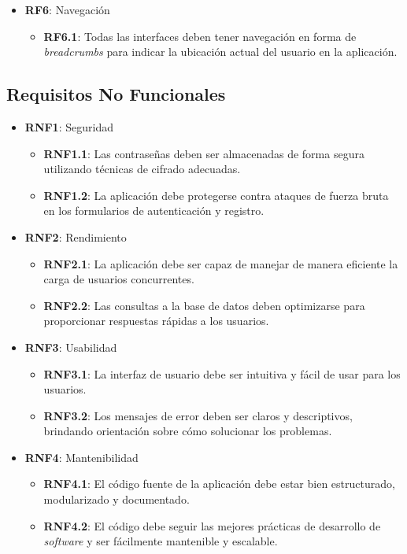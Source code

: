\begin{itemize}
  \item \textbf{RF6}: Navegación
  \begin{itemize}
    \item \textbf{RF6.1}: Todas las interfaces deben tener navegación en forma de \textit{breadcrumbs} para indicar la ubicación actual del usuario en la aplicación.
  \end{itemize}
  
\end{itemize}

\subsection{Requisitos No Funcionales}

\begin{itemize}

  \item \textbf{RNF1}: Seguridad
  \begin{itemize}
    \item \textbf{RNF1.1}: Las contraseñas deben ser almacenadas de forma segura utilizando técnicas de cifrado adecuadas.
    \item \textbf{RNF1.2}: La aplicación debe protegerse contra ataques de fuerza bruta en los formularios de autenticación y registro.
  \end{itemize}
  
  \item \textbf{RNF2}: Rendimiento
  \begin{itemize}
    \item \textbf{RNF2.1}: La aplicación debe ser capaz de manejar de manera eficiente la carga de usuarios concurrentes.
    \item \textbf{RNF2.2}: Las consultas a la base de datos deben optimizarse para proporcionar respuestas rápidas a los usuarios.
  \end{itemize}
  
  \item \textbf{RNF3}: Usabilidad
  \begin{itemize}
    \item \textbf{RNF3.1}: La interfaz de usuario debe ser intuitiva y fácil de usar para los usuarios.
    \item \textbf{RNF3.2}: Los mensajes de error deben ser claros y descriptivos, brindando orientación sobre cómo solucionar los problemas.
  \end{itemize}
  
  \item \textbf{RNF4}: Mantenibilidad
  \begin{itemize}
    \item \textbf{RNF4.1}: El código fuente de la aplicación debe estar bien estructurado, modularizado y documentado.
    \item \textbf{RNF4.2}: El código debe seguir las mejores prácticas de desarrollo de \textit{software} y ser fácilmente mantenible y escalable.
  \end{itemize}
\end{itemize}


